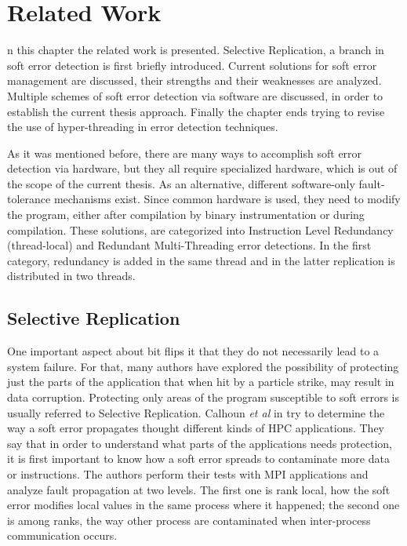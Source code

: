 %
%
\let\textcircled=\pgftextcircled
\chapter{Related Work}
\label{chap:RelatedWork}
n this chapter the related work is presented. Selective Replication, a branch in soft error detection is first briefly introduced.  Current solutions for soft error management are discussed, their strengths and their weaknesses are analyzed. Multiple schemes of soft error detection via software are discussed, in order to establish the current thesis approach. Finally the chapter ends trying to revise the use of hyper-threading in error detection techniques. 

As it was mentioned before, there are many ways to accomplish soft error detection via hardware, but they all require specialized hardware, which is out of the scope of the current thesis. As an alternative, different software-only fault-tolerance mechanisms exist. Since common hardware is used, they need to modify the program, either after compilation by binary instrumentation or during compilation. These solutions, are categorized into Instruction Level Redundancy (thread-local) and Redundant Multi-Threading error detections. In the first category, redundancy is added in the same thread and in the latter replication is distributed in two threads. 

\section{Selective Replication}
\label{sec:SelectiveReplication}

One important aspect about bit flips it that they do not necessarily lead to a system failure. For that, many authors have explored the possibility of protecting just the parts of the application that when hit by a particle strike, may result in data corruption. Protecting only areas of the program susceptible to soft errors is usually referred to Selective Replication. Calhoun \textit{et al} in \cite{calhoun2017towards} try to determine the way a soft error propagates thought different kinds of HPC applications. They say that in order to understand what parts of the applications needs protection, it is first important to know how a soft error spreads to contaminate more data or instructions. The authors perform their tests with MPI applications and analyze fault propagation at two levels. The first one is rank local, how the soft error modifies local values in the same process where it happened; the second one is among ranks, the way other process are contaminated when inter-process communication occurs. 

